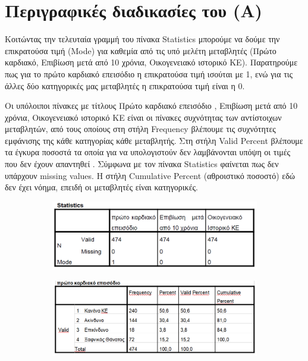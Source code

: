 \clearpage
\section{Περιγραφικές διαδικασίες του  (Α) }

Κοιτώντας την τελευταία γραμμή του πίνακα Statistics μπορούμε να δούμε την επικρατούσα τιμή (Mode) για καθεμία από τις υπό μελέτη μεταβλητές (Πρώτο καρδιακό, Επιβίωση μετά από 10 χρόνια, Οικογενειακό ιστορικό ΚΕ). Παρατηρούμε πως για το πρώτο καρδιακό επεισόδιο η επικρατούσα τιμή ισούται με 1, ενώ για τις άλλες δύο κατηγορικές μας μεταβλητές η επικρατούσα τιμή είναι η 0.

Οι υπόλοιποι πίνακες με τίτλους Πρώτο καρδιακό επεισόδιο , Επιβίωση μετά από 10 χρόνια, Οικογενειακό ιστορικό ΚΕ είναι οι πίνακες συχνότητας των αντίστοιχων μεταβλητών, από τους οποίους στη στήλη Frequency βλέπουμε τις συχνότητες εμφάνισης της κάθε κατηγορίας κάθε μεταβλητής. Στη στήλη Valid Percent βλέπουμε τα έγκυρα ποσοστά τα οποία για να υπολογιστούν δεν λαμβάνονται υπόψη οι τιμές που δεν έχουν απαντηθεί . Σύμφωνα με τον πίνακα Statistics φαίνεται πως δεν υπάρχουν missing values. Η στήλη Cumulative Percent (αθροιστικό ποσοστό) εδώ δεν έχει νόημα, επειδή οι μεταβλητές είναι κατηγορικές.

\begin{figure}[hb]
 \centering
            \begin{subfigure}{0.8\textwidth}
     \centering
         \includegraphics[width=\textwidth]{images/1.PNG}
                      \end{subfigure}
                      
     \begin{subfigure}{0.8\textwidth}
     \centering
         \includegraphics[width=\textwidth]{images/2.PNG}
                      \end{subfigure}
    \end{figure}
    
